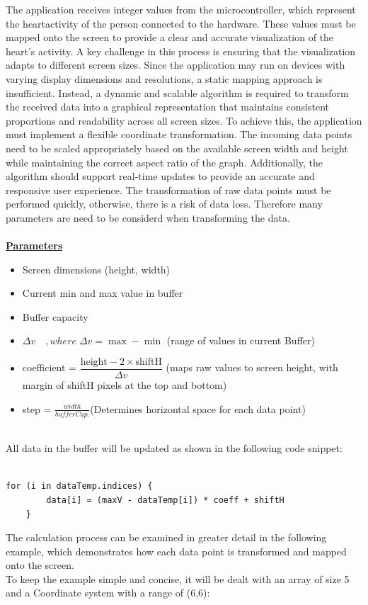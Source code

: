 {\large
The application receives integer values from the microcontroller, which represent the heartactivity of the person connected to the hardware. These values must be mapped onto the screen to provide a clear and accurate visualization of the heart’s activity.
A key challenge in this process is ensuring that the visualization adapts to different screen sizes. Since the application may run on devices with varying display dimensions and resolutions, a static mapping approach is insufficient. Instead, a dynamic and scalable algorithm is required to transform the received data into a graphical representation that maintains consistent proportions and readability across all screen sizes.
To achieve this, the application must implement a flexible coordinate transformation. The incoming data points need to be scaled appropriately based on the available screen width and height while maintaining the correct aspect ratio of the graph. Additionally, the algorithm should support real-time updates to provide an accurate and responsive user experience. The transformation of raw data points must be performed quickly, otherwise, there is a risk of data loss.
Therefore many parameters are need to be considerd when transforming the data. \mbox{}\\
\mbox{}\\
\underline{\textbf{Parameters}}\mbox{}\\
\begin{itemize}
	\item Screen dimensions (height, width)
	\item Current min and max value in buffer
	\item Buffer capacity
	\item  $\Delta v \quad ,where \; \Delta v =  \max - \min$ (range of values in current Buffer)
	\\
	\item coefficient = $\dfrac{\text{height} - 2 \times \text{shiftH} }{\Delta v}$ (maps raw values to screen height, with margin of shiftH pixels at the top and bottom)
	\\
	\item step = $\frac{width}{bufferCap.}$(Determines horizontal space for each data point)
\end{itemize}

\mbox{}\\
All data in the buffer will be updated as shown in the following code snippet:\mbox{}\\
\\
 \begin{lstlisting}[label={fig:simpleSourceGen.cs}, caption={Mapping ECG-Values to screensized values}]
 	for (i in dataTemp.indices) {
 		data[i] = (maxV - dataTemp[i]) * coeff + shiftH
 	}
 \end{lstlisting}
 The calculation process can be examined in greater detail in the following example, which demonstrates how each data point is transformed and mapped onto the screen.
\\
To keep the example simple and concise, it will be dealt with an array of size 5 and a Coordinate system with a range of (6,6): \mbox{}\\ 

}
